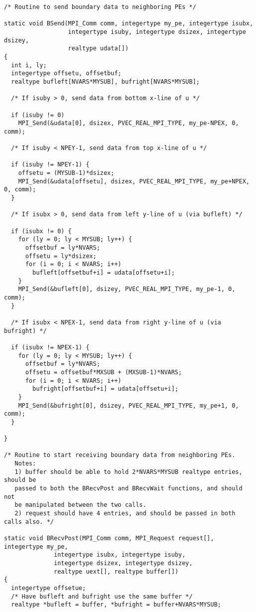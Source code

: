 \begin{verbatim}
/* Routine to send boundary data to neighboring PEs */

static void BSend(MPI_Comm comm, integertype my_pe, integertype isubx, 
                  integertype isuby, integertype dsizex, integertype dsizey, 
                  realtype udata[])
{
  int i, ly;
  integertype offsetu, offsetbuf;
  realtype bufleft[NVARS*MYSUB], bufright[NVARS*MYSUB];

  /* If isuby > 0, send data from bottom x-line of u */

  if (isuby != 0)
    MPI_Send(&udata[0], dsizex, PVEC_REAL_MPI_TYPE, my_pe-NPEX, 0, comm);

  /* If isuby < NPEY-1, send data from top x-line of u */

  if (isuby != NPEY-1) {
    offsetu = (MYSUB-1)*dsizex;
    MPI_Send(&udata[offsetu], dsizex, PVEC_REAL_MPI_TYPE, my_pe+NPEX, 0, comm);
  }

  /* If isubx > 0, send data from left y-line of u (via bufleft) */

  if (isubx != 0) {
    for (ly = 0; ly < MYSUB; ly++) {
      offsetbuf = ly*NVARS;
      offsetu = ly*dsizex;
      for (i = 0; i < NVARS; i++)
        bufleft[offsetbuf+i] = udata[offsetu+i];
    }
    MPI_Send(&bufleft[0], dsizey, PVEC_REAL_MPI_TYPE, my_pe-1, 0, comm);   
  }

  /* If isubx < NPEX-1, send data from right y-line of u (via bufright) */

  if (isubx != NPEX-1) {
    for (ly = 0; ly < MYSUB; ly++) {
      offsetbuf = ly*NVARS;
      offsetu = offsetbuf*MXSUB + (MXSUB-1)*NVARS;
      for (i = 0; i < NVARS; i++)
        bufright[offsetbuf+i] = udata[offsetu+i];
    }
    MPI_Send(&bufright[0], dsizey, PVEC_REAL_MPI_TYPE, my_pe+1, 0, comm);   
  }

}
 
/* Routine to start receiving boundary data from neighboring PEs.
   Notes:
   1) buffer should be able to hold 2*NVARS*MYSUB realtype entries, should be
   passed to both the BRecvPost and BRecvWait functions, and should not
   be manipulated between the two calls.
   2) request should have 4 entries, and should be passed in both calls also. */

static void BRecvPost(MPI_Comm comm, MPI_Request request[], integertype my_pe,
              integertype isubx, integertype isuby,
              integertype dsizex, integertype dsizey,
              realtype uext[], realtype buffer[])
{
  integertype offsetue;
  /* Have bufleft and bufright use the same buffer */
  realtype *bufleft = buffer, *bufright = buffer+NVARS*MYSUB;


\end{verbatim}
